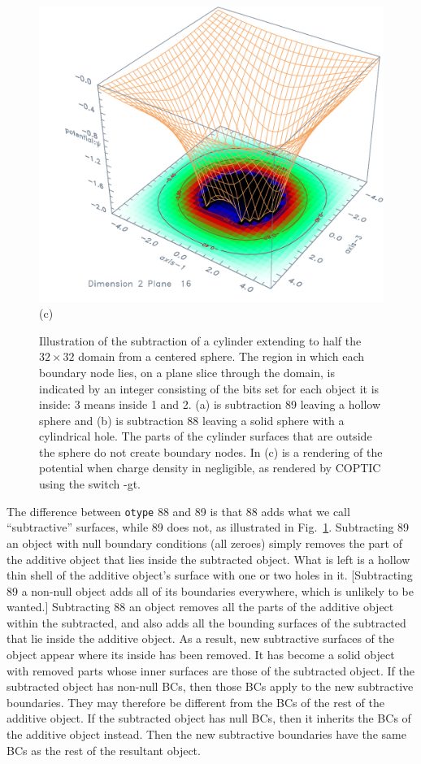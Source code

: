 \documentclass[12pt]{article}
\begin{document}
\begin{figure}[htp]
\begin{minipage}{0.5\linewidth}
\includegraphics[width=\linewidth]{subtract}\hskip -1cm (c)
\end{minipage}
\caption{Illustration of the subtraction of a cylinder extending to
  half the $32\times32$ domain from a centered sphere. The region in
  which each boundary node lies, on a plane slice through the domain,
  is indicated by an integer consisting of the bits set for each
  object it is inside: 3 means inside 1 and 2. (a) is subtraction 89
  leaving a hollow sphere and (b) is subtraction 88 leaving a solid
  sphere with a cylindrical hole. The parts of the cylinder surfaces
  that are outside the sphere do not create boundary nodes. In (c) is a
  rendering of the potential when charge density in
  negligible, as rendered by COPTIC using the switch -gt.\label{textgraph}}
\end{figure}

The difference between \verb!otype! 88 and 89 is that 88 adds what we
call ``subtractive'' surfaces, while 89 does not, as illustrated in
Fig.\ \ref{textgraph}. Subtracting 89 an
object with null boundary conditions (all zeroes) simply removes the
part of the additive object that lies inside the subtracted
object. What is left is a hollow thin shell of the additive object's
surface with one or two holes in it. [Subtracting 89 a non-null object
adds all of its boundaries everywhere, which is unlikely to be
wanted.]  Subtracting 88 an object removes all the parts of the
additive object within the subtracted, and also adds all the bounding
surfaces of the subtracted that lie inside the additive object. As a
result, new subtractive surfaces of the object appear where its inside
has been removed. It has become a solid object with removed parts
whose inner surfaces are those of the subtracted object. If the
subtracted object has non-null BCs, then those BCs apply to the new
subtractive boundaries. They may therefore be different from the BCs
of the rest of the additive object. If the subtracted object has null
BCs, then it inherits the BCs of the additive object instead. Then the
new subtractive boundaries have the same BCs as the rest of the
resultant object.
\end{document}
